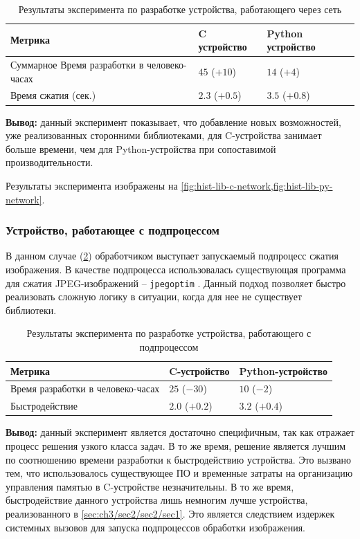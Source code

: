 \begin{longtable}{| p{5cm} | p{5cm} | p{5cm} |}
    \caption{Результаты эксперимента по разработке устройства, работающего через сеть}\label{tbl:remote-processing} \\
    \hline
        Метрика &
        C устройство &
        Python устройство \\
    \hline
        Суммарное Время разработки в человеко-часах &
        $45$ ($+10$) &
        $14$ ($+4$) \\
    \hline
        Время сжатия (сек.)&
        $2.3$ ($+0.5$)  &
        $3.5$ ($+0.8$)  \\
    \hline
\end{longtable}

\textbf{Вывод:} данный эксперимент показывает, что добавление новых возможностей,
уже реализованных сторонними библиотеками, для C-устройства занимает больше времени,
чем для Python-устройства при сопоставимой производительности.

Результаты эксперимента изображены на \cref{fig:hist-lib-c-network,fig:hist-lib-py-network}.

\subsubsection{Устройство, работающее с подпроцессом}\label{sec:ch3/sec2/sec2/sec2}

В данном случае (\cref{tbl:subprocessing}) обработчиком выступает запускаемый подпроцесс сжатия
изображения. В качестве подпроцесса использовалась существующая программа
для сжатия JPEG-изображений -- \texttt{jpegoptim} \cite{jpegoptim}.
Данный подход позволяет быстро реализовать сложную логику в ситуации, когда
для нее не существует библиотеки.

\begin{longtable}{| p{5cm} | p{5cm} | p{5cm} |}
    \caption{Результаты эксперимента по разработке устройства, работающего с подпроцессом}\label{tbl:subprocessing} \\
    \hline
    Метрика & C-устройство & Python-устройство \\
    \hline
        Время разработки в человеко-часах &
        $25$ ($-30$) &
        $10$ ($-2$) \\
    \hline
        Быстродействие &
        $2.0$ ($+0.2$)  &
        $3.2$ ($+0.4$)  \\
    \hline
\end{longtable}

\textbf{Вывод:} данный эксперимент является достаточно специфичным, так как отражает процесс
решения узкого класса задач. В то же время, решение является лучшим по соотношению
времени разработки к быстродействию устройства.
Это вызвано тем, что использовалось существующее ПО и временные затраты на
организацию управления памятью в C-устройстве незначительны.
В то же время, быстродействие данного устройства лишь немногим лучше устройства,
реализованного в \cref{sec:ch3/sec2/sec2/sec1}. Это является следствием издержек
системных вызовов для запуска подпроцессов обработки изображения.

